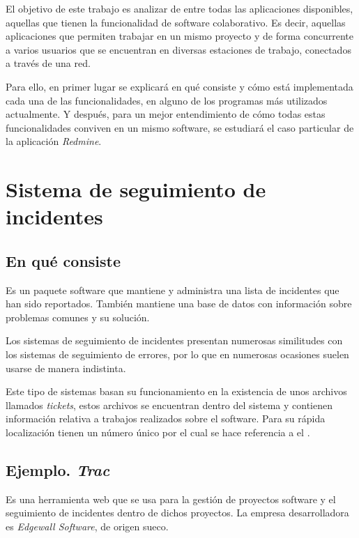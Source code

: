 \documentclass[11pt,a4paper,spanish,twoside]{report}
\begin{document}
El objetivo de este trabajo es analizar de entre todas las aplicaciones
disponibles, aquellas que tienen la funcionalidad de software colaborativo.
Es decir, aquellas aplicaciones que permiten trabajar en un mismo proyecto y
de forma concurrente a varios usuarios que se encuentran en diversas
estaciones de trabajo, conectados a través de una red.

Para ello, en primer lugar se explicará en qué consiste y cómo está
implementada cada una de las funcionalidades, en alguno de los programas más
utilizados actualmente. Y después, para un mejor entendimiento de cómo todas
estas funcionalidades conviven en un mismo software, se estudiará el caso
particular de la aplicación \emph{Redmine}.

\chapter{Sistema de seguimiento de incidentes}
\section{En qué consiste}
Es un paquete software que mantiene y administra una lista de incidentes que
han sido reportados. También mantiene una base de datos con información sobre
problemas comunes y su solución.

Los sistemas de seguimiento de incidentes presentan numerosas similitudes con
los sistemas de seguimiento de errores, por lo que en numerosas ocasiones
suelen usarse de manera indistinta.

Este tipo de sistemas basan su funcionamiento en la existencia de unos
archivos llamados \emph{tickets}, estos archivos se encuentran dentro del
sistema y contienen información relativa a trabajos realizados sobre el
software. Para su rápida localización tienen un número único por el cual se
hace referencia a el \cite{ITS}.

\section{Ejemplo. \emph{Trac}}
Es una herramienta web que se usa para la gestión de proyectos software y el
seguimiento de incidentes dentro de dichos proyectos. La empresa
desarrolladora es \emph{Edgewall Software}, de origen sueco. \cite{TRA}
\end{document}

